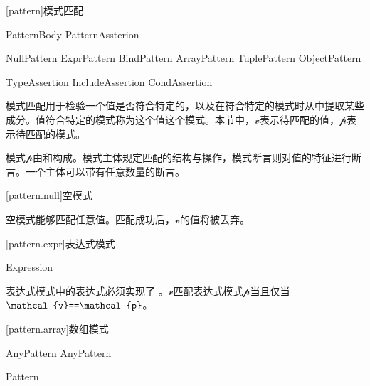
[pattern]{模式匹配}

\begin{bnf}
 \br
    PatternBody PatternAssterion\bnfs
\end{bnf}

\begin{bnf}
 \br
    NullPattern \br
    ExprPattern \br
    BindPattern \br
    ArrayPattern \br
    TuplePattern \br
    ObjectPattern \br
\end{bnf}

\begin{bnf}
    TypeAssertion
    IncludeAssertion
    CondAssertion
\end{bnf}

\pnum
模式匹配用于检验一个值是否符合特定的，以及在符合特定的模式时从中提取某些成分。值符合特定的模式称为这个值这个模式。本节中，$\mathcal{v}$表示待匹配的值，$\mathcal{p}$表示待匹配的模式。

\pnum
模式$\mathcal{p}$由和构成。模式主体规定匹配的结构与操作，模式断言则对值的特征进行断言。一个主体可以带有任意数量的断言。

[pattern.null]{空模式}

\begin{bnf}
 \br
    \tcode{_}
\end{bnf}

\pnum
空模式能够匹配任意值。匹配成功后，$\mathcal{v}$的值将被丢弃。

[pattern.expr]{表达式模式}

\begin{bnf}
 \br
    Expression
\end{bnf}

\pnum
表达式模式中的表达式必须实现了 。$\mathcal{v}$匹配表达式模式$\mathcal{p}$当且仅当$\mathcal{v}\tcode{==}\mathcal{p}$。

[pattern.array]{数组模式}

\begin{bnf}
 \br
    \terminal{[} AnyPattern \bnflp\terminal{,} AnyPattern\bnfrp\bnfs\ \terminal{]}
\end{bnf}

\begin{bnf}
 \br
    Pattern\br
\end{bnf}

